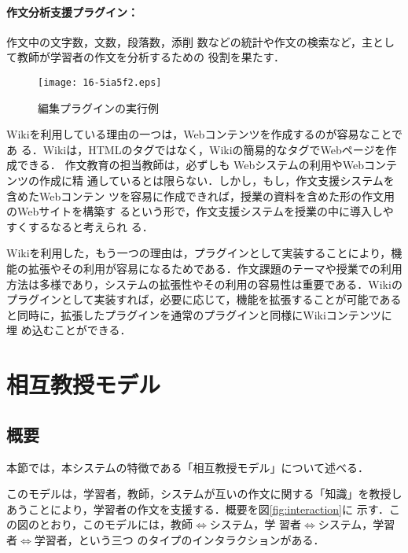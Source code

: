 \documentclass[japanese]{jnlp_1.4}
\begin{document}
{\paragraph{作文分析支援プラグイン：} 作文中の文字数，文数，段落数，添削
数などの統計や作文の検索など，主として教師が学習者の作文を分析するための
役割を果たす．


\begin{figure}[t]
 \begin{center}
  \texttt{[image: 16-5ia5f2.eps]}
  \caption{編集プラグインの実行例}
  \label{fig:edit}
 \end{center}   
\end{figure}


Wikiを利用している理由の一つは，Webコンテンツを作成するのが容易なことであ
る．Wikiは，HTMLのタグではなく，Wikiの簡易的なタグでWebページを作成できる．
作文教育の担当教師は，必ずしも Webシステムの利用やWebコンテンツの作成に精
通しているとは限らない．しかし，もし，作文支援システムを含めたWebコンテン
ツを容易に作成できれば，授業の資料を含めた形の作文用のWebサイトを構築す
るという形で，作文支援システムを授業の中に導入しやすくするなると考えられ
る．

Wikiを利用した，もう一つの理由は，プラグインとして実装することにより，機
能の拡張やその利用が容易になるためである．作文課題のテーマや授業での利用
方法は多様であり，システムの拡張性やその利用の容易性は重要である．Wikiの
プラグインとして実装すれば，必要に応じて，機能を拡張することが可能である
と同時に，拡張したプラグインを通常のプラグインと同様にWikiコンテンツに埋
め込むことができる．
} 



\section{相互教授モデル}\label{sec:model}

\subsection{概要}\label{ssec:model_abst}

本節では，本システムの特徴である「相互教授モデル」について述べる．

このモデルは，学習者，教師，システムが互いの作文に関する「知識」を教授し
あうことにより，学習者の作文を支援する．概要を図\ref{fig:interaction}に
示す．この図のとおり，このモデルには，教師$\Leftrightarrow$システム，学
習者$\Leftrightarrow$システム，学習者$\Leftrightarrow$学習者，という三つ
のタイプのインタラクションがある．
\end{document}
